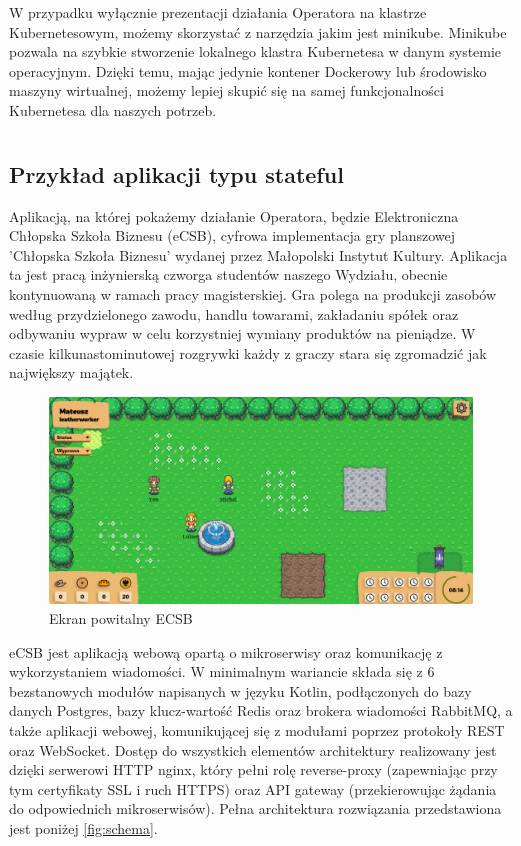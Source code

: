\documentclass[polish]{aghengthesis}
\begin{document}
W przypadku wyłącznie prezentacji działania Operatora na klastrze Kubernetesowym, możemy skorzystać z narzędzia jakim jest minikube. Minikube pozwala na szybkie stworzenie lokalnego klastra Kubernetesa w danym systemie operacyjnym. Dzięki temu, mając jedynie kontener Dockerowy lub środowisko maszyny wirtualnej, możemy lepiej skupić się na samej funkcjonalności Kubernetesa dla naszych potrzeb. \cite{minikube}

\chapter{\ChapterTitleCaseStudyDesc}
\label{sec:opis-studium-przypadku}

\section{Przykład aplikacji typu stateful}
Aplikacją, na której pokażemy działanie Operatora, będzie Elektroniczna Chłopska Szkoła Biznesu (eCSB), cyfrowa implementacja gry planszowej 'Chłopska Szkoła Biznesu' wydanej przez Małopolski Instytut Kultury. Aplikacja ta jest pracą inżynierską czworga studentów naszego Wydziału, obecnie kontynuowaną w ramach pracy magisterskiej. Gra polega na produkcji zasobów według przydzielonego zawodu, handlu towarami, zakładaniu spółek oraz odbywaniu wypraw w celu korzystniej wymiany produktów na pieniądze. W czasie kilkunastominutowej rozgrywki każdy z graczy stara się zgromadzić jak największy majątek.

\begin{figure}[h!]
    \centering
    \includegraphics[width=1\linewidth]{resources/game_1.png}
    \caption{Ekran powitalny ECSB}
    \label{fig:stateful}
\end{figure}

eCSB jest aplikacją webową opartą o mikroserwisy oraz komunikację z wykorzystaniem wiadomości. W minimalnym wariancie składa się z 6 bezstanowych modułów napisanych w języku Kotlin, podłączonych do bazy danych Postgres, bazy klucz-wartość Redis oraz brokera wiadomości RabbitMQ, a także aplikacji webowej, komunikującej się z modułami poprzez protokoły REST oraz WebSocket. Dostęp do wszystkich elementów architektury realizowany jest dzięki serwerowi HTTP nginx, który pełni rolę reverse-proxy (zapewniając przy tym certyfikaty SSL i ruch HTTPS) oraz API gateway (przekierowując żądania do odpowiednich mikroserwisów). Pełna architektura rozwiązania przedstawiona jest poniżej \ref{fig:schema}.
\end{document}
